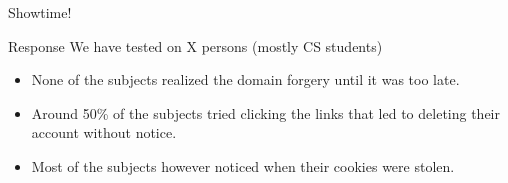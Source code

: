 \documentclass{beamer}
\begin{document}
\begin{frame}{Showtime!}
\end{frame}

\begin{frame}{Response}
    We have tested on X persons (mostly CS students)
    \begin{itemize}
        \item None of the subjects realized the domain forgery until it was too
              late.
        \item Around 50\% of the subjects tried clicking the links that led to
              deleting their account without notice.
        \item Most of the subjects however noticed when their cookies were
              stolen.
    \end{itemize}
\end{frame}
\end{document}
